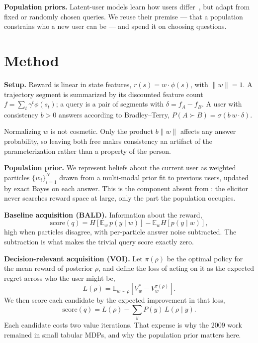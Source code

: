 \documentclass[10pt]{article}
\begin{document}
\textbf{Population priors.} Latent-user models learn how users
differ~\citep{poddar2024,pal2024,maxmin2024}, but adapt from fixed or randomly
chosen queries. We reuse their premise --- that a population constrains who a
new user can be --- and spend it on choosing questions.

\section{Method}

\textbf{Setup.} Reward is linear in state features, $r(s) = w \cdot \phi(s)$,
with $\|w\| = 1$. A trajectory segment is summarized by its discounted feature
count $f = \sum_t \gamma^t \phi(s_t)$; a query is a pair of segments with
$\delta = f_A - f_B$. A user with consistency $b > 0$ answers according to
Bradley--Terry, $P(A \succ B) = \sigma(b \, w \cdot \delta)$.

Normalizing $w$ is not cosmetic. Only the product $b\|w\|$ affects any answer
probability, so leaving both free makes consistency an artifact of the
parameterization rather than a property of the person.

\textbf{Population prior.} We represent beliefs about the current user as
weighted particles $\{w_i\}_{i=1}^N$ drawn from a multi-modal prior fit to
previous users, updated by exact Bayes on each answer. This is the component
absent from \citet{regan2009}: the elicitor never searches reward space at
large, only the part the population occupies.

\textbf{Baseline acquisition (BALD).} Information about the reward,
\begin{equation}
\text{score}(q) = H\!\left[\mathbb{E}_w\, p(y \mid w)\right]
                - \mathbb{E}_w H\!\left[p(y \mid w)\right],
\end{equation}
high when particles disagree, with per-particle answer noise subtracted. The
subtraction is what makes the trivial query score exactly zero.

\textbf{Decision-relevant acquisition (VOI).} Let $\pi(\rho)$ be the optimal
policy for the mean reward of posterior $\rho$, and define the loss of acting on
it as the expected regret across who the user might be,
\begin{equation}
L(\rho) = \mathbb{E}_{w \sim \rho}\!\left[V^{*}_{w} - V^{\pi(\rho)}_{w}\right].
\end{equation}
We then score each candidate by the expected improvement in that loss,
\begin{equation}
\text{score}(q) = L(\rho) - \sum_{y} P(y)\, L(\rho \mid y).
\end{equation}
Each candidate costs two value iterations. That expense is why the 2009 work
remained in small tabular MDPs, and why the population prior matters here.
\end{document}
